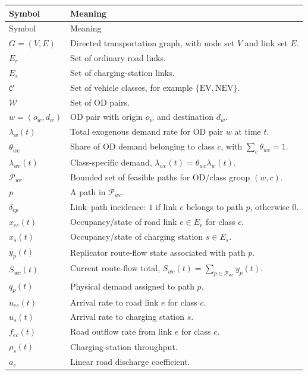 \documentclass[11pt]{article}
\begin{document}
\begin{longtable}{>{\raggedright\arraybackslash}p{}
                  >{\raggedright\arraybackslash}p{}}
\toprule
Symbol & Meaning \\
\midrule
\endfirsthead
\toprule
Symbol & Meaning \\
\midrule
\endhead
$G=(V,E)$ & Directed transportation graph, with node set $V$ and link set $E$. \\
$E_r$ & Set of ordinary road links. \\
$E_s$ & Set of charging-station links. \\
$\mathcal{C}$ & Set of vehicle classes, for example $\{\mathrm{EV},\mathrm{NEV}\}$. \\
$\mathcal{W}$ & Set of OD pairs. \\
$w=(o_w,d_w)$ & OD pair with origin $o_w$ and destination $d_w$. \\
$\lambda_w(t)$ & Total exogenous demand rate for OD pair $w$ at time $t$. \\
$\theta_{wc}$ & Share of OD demand belonging to class $c$, with $\sum_c\theta_{wc}=1$. \\
$\lambda_{wc}(t)$ & Class-specific demand, $\lambda_{wc}(t)=\theta_{wc}\lambda_w(t)$. \\
$\mathcal{P}_{wc}$ & Bounded set of feasible paths for OD/class group $(w,c)$. \\
$p$ & A path in $\mathcal{P}_{wc}$. \\
$\delta_{ep}$ & Link--path incidence: $1$ if link $e$ belongs to path $p$, otherwise $0$. \\
$x_{ec}(t)$ & Occupancy/state of road link $e\in E_r$ for class $c$. \\
$x_s(t)$ & Occupancy/state of charging station $s\in E_s$. \\
$y_p(t)$ & Replicator route-flow state associated with path $p$. \\
$S_{wc}(t)$ & Current route-flow total, $S_{wc}(t)=\sum_{p\in\mathcal{P}_{wc}}y_p(t)$. \\
$q_p(t)$ & Physical demand assigned to path $p$. \\
$u_{ec}(t)$ & Arrival rate to road link $e$ for class $c$. \\
$u_s(t)$ & Arrival rate to charging station $s$. \\
$f_{ec}(t)$ & Road outflow rate from link $e$ for class $c$. \\
$\rho_s(t)$ & Charging-station throughput. \\
$a_e$ & Linear road discharge coefficient. \\

\end{longtable}
\end{document}
